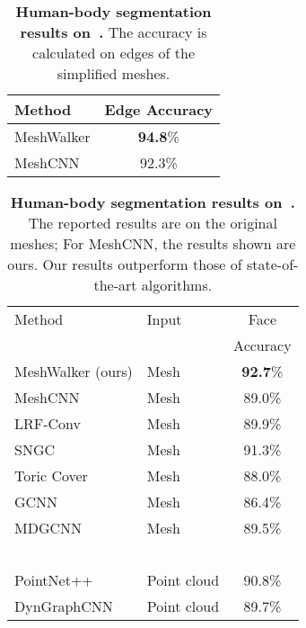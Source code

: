 \documentclass[acmtog]{acmart}
\begin{document}
\begin{table}[t]\caption{{\bf Human-body segmentation results on~\cite{maron2017convolutional}.}
The accuracy is  calculated on edges of the simplified meshes.
}
\begin{center}
 \begin{tabular}{||l c||} 
 \hline
 Method &  Edge Accuracy\\ [0.5ex] 
 \hline\hline\hline
 MeshWalker  & \textbf{94.8}\% \\ 
 \hline
 MeshCNN & 92.3\%  \\
 \hline
\end{tabular}
\label{tbl:human_body_segmentation_on_edge}
\end{center}
\end{table}

\begin{table}[htb]\caption{{\bf Human-body segmentation results on~\cite{maron2017convolutional}.} 
The reported results are on the original meshes;
For MeshCNN, the results shown are ours.
Our results outperform those of state-of-the-art algorithms.
}
\begin{center}
 \begin{tabular}{||l l c||} 
 \hline
 Method &  Input & Face\\ [0.5ex] 
   &    & Accuracy\\ [0.5ex] 
 \hline\hline\hline
 MeshWalker (ours)  & Mesh & \textbf{92.7}\% \\ 
 \hline
 MeshCNN~\cite{hanocka2019meshcnn} & Mesh & 89.0\% \\
 \hline
 LRF-Conv~\cite{yang2020continuous} & Mesh & 89.9\% \\
 \hline
SNGC~\cite{haim2019surface} & Mesh & 91.3\%  \\
 \hline
 Toric Cover~\cite{maron2017convolutional} & Mesh & 88.0\%  \\
 \hline
 GCNN~\cite{masci2015geodesic} & Mesh & 86.4\%  \\
 \hline
 MDGCNN & Mesh & 89.5\%  \\
 ~\cite{poulenard2018multi} & &   \\
 \hline
 \hline
 PointNet++~\cite{qi2017pointnet++} & Point cloud & 90.8\% \\
 \hline
 DynGraphCNN~\cite{wang2019dynamic} & Point cloud & 89.7\%  \\
 \hline
\end{tabular}
\label{tbl:human_body_segmentation}
\end{center}
\end{table}
\end{document}
